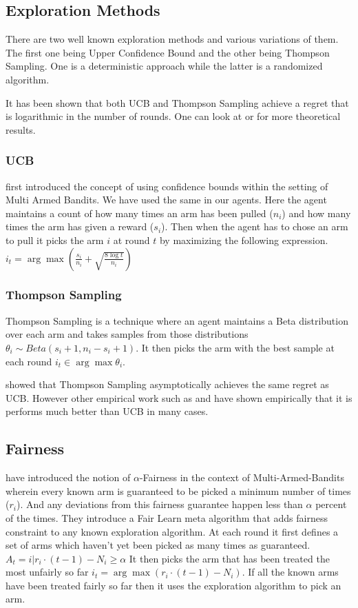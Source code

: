 \subsection{Exploration Methods}
There are two well known exploration methods and various variations of them. The first one being Upper Confidence Bound and the other being Thompson Sampling. One is a deterministic approach while the latter is a randomized algorithm.

It has been shown that both UCB and Thompson Sampling achieve a regret that is logarithmic in the number of rounds. One can look at  or  for more theoretical results.

\subsubsection{UCB}
 first introduced the concept of using confidence bounds within the setting of Multi Armed Bandits. We have used the same in our agents. Here the agent maintains a count of how many times an arm has been pulled ($n_i$) and how many times the arm has given a reward ($s_i$). Then when the agent has to chose an arm to pull it picks the arm $i$ at round $t$ by maximizing the following expression. $i_t = \arg\max ( \frac{s_i}{n_i} + \sqrt{\frac{8\log t}{n_i} })$

\subsubsection{Thompson Sampling}
Thompson Sampling is a technique where an agent maintains a Beta distribution over each arm and takes samples from those distributions $\theta_i \sim Beta(s_i + 1, n_i - s_i + 1)$. It then picks the arm with the best sample at each round $i_t \in \arg\max \theta_i$. 

 showed that Thompson Sampling asymptotically achieves the same regret as UCB. However other empirical work such as  and  have shown empirically that it is performs much better than UCB in many cases. 

\subsection{Fairness}
 have introduced the notion of $\alpha$-Fairness in the context of Multi-Armed-Bandits wherein every known arm is guaranteed to be picked a minimum number of times ($r_i$). And any deviations from this fairness guarantee happen less than $\alpha$ percent of the times. They introduce a Fair Learn meta algorithm that adds fairness constraint to any known exploration algorithm. At each round it first defines a set of arms which haven't yet been picked as many times as guaranteed. $A_t = {i | r_i \cdot (t-1) - N_i \geq \alpha}$ It then picks the arm that has been treated the most unfairly so far $i _t = \arg\max (r_i \cdot (t-1) - N_i)$. If all the known arms have been treated fairly so far then it uses the exploration algorithm to pick an arm.